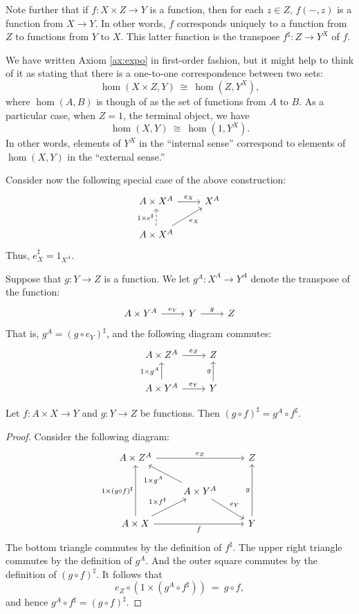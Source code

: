 Note further that if $f:X\times Z\to Y$ is a function, then for each
$z\in Z$, $f(-,z)$ is a function from $X\to Y$.  In other words, $f$
corresponds uniquely to a function from $Z$ to functions from $Y$ to
$X$.  This latter function is the transpose $f^\sharp :Z\to Y^X$ of
$f$.

We have written Axiom \ref{ax:expo} in first-order fashion, but it
might help to think of it as stating that there is a one-to-one
correspondence between two sets:
\[ \hom (X\times Z,Y) \: \cong \: \hom (Z,Y^X ) , \] where $\hom
(A,B)$ is though of as the set of functions from $A$ to $B$.  As a
particular case, when $Z=1$, the terminal object, we have 
\[ \hom (X,Y) \: \cong \: \hom (1,Y^X) .\] In other words, elements of
$Y^X$ in the ``internal sense'' correspond to elements of $\hom (X,Y)$
in the ``external sense.''

Consider now the following special case of the above construction:
\[ \begin{tikzcd}
  A\times X^A \arrow{r}{e_X} & X^A  \\
  A\times X^A \arrow[dashed]{u}{1\times e^\sharp } \arrow[ur,"e_X"']
\end{tikzcd} \] Thus, $e_X^\sharp = 1_{X^A}$.

\begin{defn} Suppose that $g:Y\to Z$ is a function.  We let
  $g^A:X^A\to Y^A$ denote the transpose of the function:
  \[ \begin{tikzcd} A\times Y^A \arrow[r,"e_Y"] & Y \arrow[r,"g"] &
    Z \end{tikzcd} \] That is, $g^A=(g\circ e_Y)^\sharp$, and the
  following diagram commutes:
\[ \begin{tikzcd}
A\times Z^A \arrow[r,"e_Z"] & Z \\
A\times Y^A \arrow[u,"1\times g^A"] \arrow[r,"e_Y"] & Y \arrow[u,"g"] 
\end{tikzcd} \]
\end{defn}

\begin{prop} Let $f:A\times X\to Y$ and $g:Y\to Z$ be functions.
  Then $(g\circ f )^\sharp =g^A\circ f^\sharp$. \end{prop}

\begin{proof} Consider the following diagram:
\[ \begin{tikzcd}
A \times Z^A \arrow[rr,"e_Z"] & & Z \\
& A\times Y^A \arrow[ul,"1\times g^A"] \arrow[dr,"e_Y"] \\
A\times X \arrow[uu,"1\times (g\circ f)^\sharp"] \arrow[ur,"1\times f^\sharp"]
\arrow[rr,"f"'] & & Y \arrow[uu,"g"] \end{tikzcd} \]
The bottom triangle commutes by the definition of $f^\sharp$.  The
upper right triangle commutes by the definition of $g^A$.  And the
outer square commutes by the definition of $(g\circ f)^\sharp$.  It
follows that 
\[ e_Z\circ (1\times (g^A\circ f^\sharp )) \: = \: g\circ f ,\]
and hence $g^A\circ f^\sharp=(g\circ f)^\sharp$. 
\end{proof}

